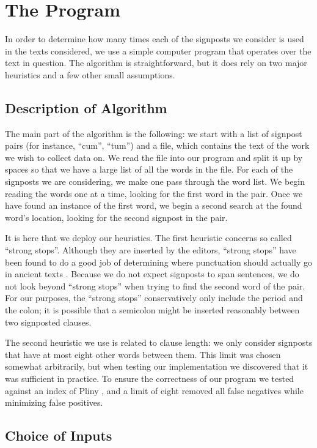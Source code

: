 \section{The Program}

In order to determine how many times each of the signposts we consider is used in the texts considered, we use a simple computer program that operates over the text in question. The algorithm is straightforward, but it does rely on two major heuristics and a few other small assumptions.

\subsection{Description of Algorithm}

The main part of the algorithm is the following: we start with a list of signpost pairs (for instance, ``cum'', ``tum'') and a file, which contains the text of the work we wish to collect data on. We read the file into our program and split it up by spaces so that we have a large list of all the words in the file. For each of the signposts we are considering, we make one pass through the word list. We begin reading the words one at a time, looking for the first word in the pair. Once we have found an instance of the first word, we begin a second search at the found word's location, looking for the second signpost in the pair.

It is here that we deploy our heuristics. The first heuristic concerns so called ``strong stops''. Although they are inserted by the editors, ``strong stops'' have been found to do a good job of determining where punctuation should actually go in ancient texts \cite{strongstop}. Because we do not expect signposts to span sentences, we do not look beyond ``strong stops'' when trying to find the second word of the pair. For our purposes, the ``strong stops'' conservatively only include the period and the colon; it is possible that a semicolon might be inserted reasonably between two signposted clauses.

The second heuristic we use is related to clause length: we only consider signposts that have at most eight other words between them. This limit was chosen somewhat arbitrarily, but when testing our implementation we discovered that it was sufficient in practice. To ensure the correctness of our program we tested against an index of Pliny \cite{index}, and a limit of eight removed all false negatives while minimizing false positives.

\subsection{Choice of Inputs}

